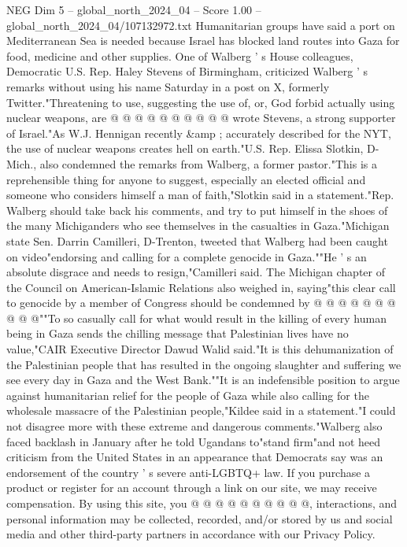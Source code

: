 \begin{textsample}{NEG Dim 5 – global\_north\_2024\_04 – Score 1.00 – global\_north\_2024\_04/107132972.txt}
Humanitarian groups have said a port on Mediterranean Sea is needed because Israel has blocked land routes into Gaza for food, medicine and other supplies.
One of Walberg ' s House colleagues, Democratic U.S.
Rep.
Haley Stevens of Birmingham, criticized Walberg ' s remarks without using his name Saturday in a post on X, formerly Twitter."Threatening to use, suggesting the use of, or, God forbid actually using nuclear weapons, are @ @ @ @ @ @ @ @ @ @ wrote Stevens, a strong supporter of Israel."As W.J.
Hennigan recently \&amp ; accurately described for the NYT, the use of nuclear weapons creates hell on earth."U.S.
Rep.
Elissa Slotkin, D-Mich., also condemned the remarks from Walberg, a former pastor."This is a reprehensible thing for anyone to suggest, especially an elected official and someone who considers himself a man of faith,"Slotkin said in a statement."Rep.
Walberg should take back his comments, and try to put himself in the shoes of the many Michiganders who see themselves in the casualties in Gaza."Michigan state Sen.
Darrin Camilleri, D-Trenton, tweeted that Walberg had been caught on video"endorsing and calling for a complete genocide in Gaza.""He ' s an absolute disgrace and needs to resign,"Camilleri said.
The Michigan chapter of the Council on American-Islamic Relations also weighed in, saying"this clear call to genocide by a member of Congress should be condemned by @ @ @ @ @ @ @ @ @ @""To so casually call for what would result in the killing of every human being in Gaza sends the chilling message that Palestinian lives have no value,"CAIR Executive Director Dawud Walid said."It is this dehumanization of the Palestinian people that has resulted in the ongoing slaughter and suffering we see every day in Gaza and the West Bank.""It is an indefensible position to argue against humanitarian relief for the people of Gaza while also calling for the wholesale massacre of the Palestinian people,"Kildee said in a statement."I could not disagree more with these extreme and dangerous comments."Walberg also faced backlash in January after he told Ugandans to"stand firm"and not heed criticism from the United States in an appearance that Democrats say was an endorsement of the country ' s severe anti-LGBTQ+ law.
If you purchase a product or register for an account through a link on our site, we may receive compensation.
By using this site, you @ @ @ @ @ @ @ @ @ @, interactions, and personal information may be collected, recorded, and/or stored by us and social media and other third-party partners in accordance with our Privacy Policy.

\end{textsample}
